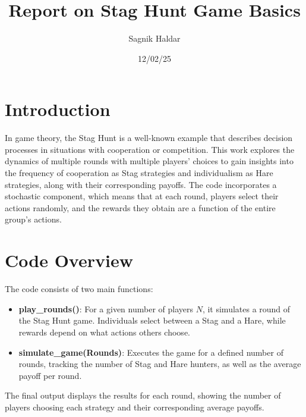 \documentclass{article}
\begin{document}
\title{Report on Stag Hunt Game Basics}
\author{Sagnik Haldar}
\date{12/02/25}
\maketitle

\section{Introduction} In game theory, the Stag Hunt is a well-known example that describes decision processes in situations with cooperation or competition. This work explores the dynamics of multiple rounds with multiple players' choices to gain insights into the frequency of cooperation as Stag strategies and individualism as Hare strategies, along with their corresponding payoffs. The code incorporates a stochastic component, which means that at each round, players select their actions randomly, and the rewards they obtain are a function of the entire group's actions.

\section{Code Overview}
The code consists of two main functions:
\begin{itemize}
    \item \textbf{play\_rounds()}: For a given number of players $N$, it simulates a round of the Stag Hunt game. Individuals select between a Stag and a Hare, while rewards depend on what actions others choose.
    \item \textbf{simulate\_game(Rounds)}: Executes the game for a defined number of rounds, tracking the number of Stag and Hare hunters, as well as the average payoff per round.
\end{itemize}


The final output displays the results for each round, showing the number of players choosing each strategy and their corresponding average payoffs.
\end{document}
